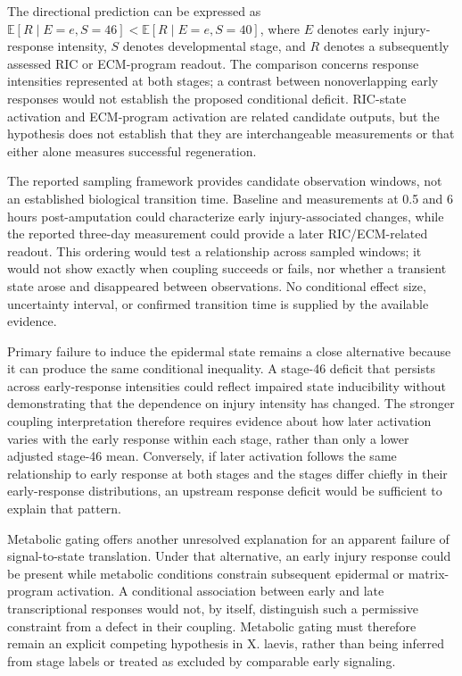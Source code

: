 \documentclass[11pt]{article}
\begin{document}
The directional prediction can be expressed as $\mathbb{E}[R\mid E=e,S=46]<\mathbb{E}[R\mid E=e,S=40]$, where $E$ denotes early injury-response intensity, $S$ denotes developmental stage, and $R$ denotes a subsequently assessed RIC or ECM-program readout. The comparison concerns response intensities represented at both stages; a contrast between nonoverlapping early responses would not establish the proposed conditional deficit. RIC-state activation and ECM-program activation are related candidate outputs, but the hypothesis does not establish that they are interchangeable measurements or that either alone measures successful regeneration.

The reported sampling framework provides candidate observation windows, not an established biological transition time. Baseline and measurements at 0.5 and 6 hours post-amputation could characterize early injury-associated changes, while the reported three-day measurement could provide a later RIC/ECM-related readout. This ordering would test a relationship across sampled windows; it would not show exactly when coupling succeeds or fails, nor whether a transient state arose and disappeared between observations. No conditional effect size, uncertainty interval, or confirmed transition time is supplied by the available evidence.

Primary failure to induce the epidermal state remains a close alternative because it can produce the same conditional inequality. A stage-46 deficit that persists across early-response intensities could reflect impaired state inducibility without demonstrating that the dependence on injury intensity has changed. The stronger coupling interpretation therefore requires evidence about how later activation varies with the early response within each stage, rather than only a lower adjusted stage-46 mean. Conversely, if later activation follows the same relationship to early response at both stages and the stages differ chiefly in their early-response distributions, an upstream response deficit would be sufficient to explain that pattern.

Metabolic gating offers another unresolved explanation for an apparent failure of signal-to-state translation. Under that alternative, an early injury response could be present while metabolic conditions constrain subsequent epidermal or matrix-program activation. A conditional association between early and late transcriptional responses would not, by itself, distinguish such a permissive constraint from a defect in their coupling. Metabolic gating must therefore remain an explicit competing hypothesis in X. laevis, rather than being inferred from stage labels or treated as excluded by comparable early signaling.
\end{document}
